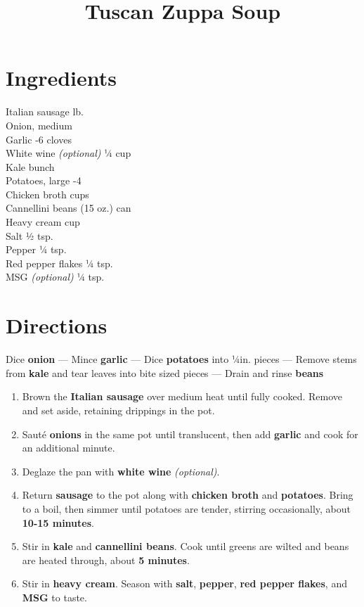 \documentclass[11pt,letterpaper]{article}
\title{Tuscan Zuppa Soup}
\author{}
\date{}
\begin{document}
\maketitle
\thispagestyle{empty}

\section*{Ingredients}
\setlength{\columnsep}{20pt}
\begin{multicols}{2}
\noindent
    Italian sausage  lb. \\
    Onion, medium  \\
    Garlic -6 cloves \\
    White wine \textit{(optional)} \dotfill ¼ cup \\
    Kale  bunch \\
    Potatoes, large -4 \\
    \columnbreak
    Chicken broth  cups \\
    Cannellini beans  (15 oz.) can \\
    Heavy cream  cup \\
    Salt \dotfill ½ tsp.\\
    Pepper \dotfill ¼ tsp. \\
	Red pepper flakes \dotfill ¼ tsp. \\
    MSG \textit{(optional)} \dotfill ¼ tsp.
\end{multicols}

\section*{Directions}

\noindent
Dice \textbf{onion} ---
Mince \textbf{garlic} ---
Dice \textbf{potatoes} into ¼in. pieces ---
Remove stems from \textbf{kale} and tear leaves into bite sized pieces ---
Drain and rinse \textbf{beans}

\begin{enumerate}
    \item Brown the \textbf{Italian sausage} over medium heat until fully cooked. Remove and set aside, retaining drippings in the pot.
    \item Sauté \textbf{onions} in the same pot until translucent, then add \textbf{garlic} and cook for an additional minute.
    \item Deglaze the pan with \textbf{white wine} \textit{(optional)}.
    \item Return \textbf{sausage} to the pot along with \textbf{chicken broth} and \textbf{potatoes}. Bring to a boil, then simmer until potatoes are tender, stirring occasionally, about \textbf{10-15 minutes}.
    \item Stir in \textbf{kale} and \textbf{cannellini beans}. Cook until greens are wilted and beans are heated through, about \textbf{5 minutes}.
    \item Stir in \textbf{heavy cream}. Season with \textbf{salt}, \textbf{pepper}, \textbf{red pepper flakes}, and \textbf{MSG} to taste.
\end{enumerate}
\end{document}

